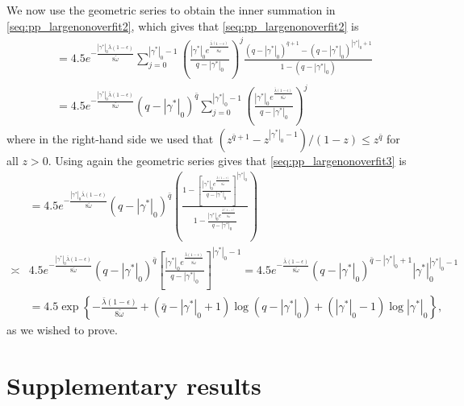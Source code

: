 We now use the geometric series to obtain the inner summation in \eqref{seq:pp_largenonoverfit2}, which gives that \eqref{seq:pp_largenonoverfit2} is
\begin{align}
&=4.5 e^{ -\frac{|\gamma^*|_0\bar{\lambda}(1-\epsilon)}{ 8\tilde{\omega}}}
 \sum_{j=0}^{|\gamma^*|_0-1} \left( \frac{|\gamma^*|_0 e^{ \frac{\bar{\lambda}(1-\epsilon)}{ 8\tilde{\omega}}}}{q - |\gamma^*|_0} \right)^j  
\frac{(q-|\gamma^*|_0)^{\bar{q}+1} - (q-|\gamma^*|_0)^{|\gamma^*|_0+1}}{1 - (q-|\gamma^*|_0)}
\nonumber \\
&=4.5 e^{ -\frac{|\gamma^*|_0\bar{\lambda}(1-\epsilon)}{ 8\tilde{\omega}}}
(q-|\gamma^*|_0)^{\bar{q}}
 \sum_{j=0}^{|\gamma^*|_0-1} \left( \frac{|\gamma^*|_0 e^{ \frac{\bar{\lambda}(1-\epsilon)}{ 8\tilde{\omega}}}}{q - |\gamma^*|_0} \right)^j  
\label{seq:pp_largenonoverfit3}
\end{align}
where in the right-hand side we used that $(z^{\bar{q}+1} - z^{|\gamma^*|_0-1})/(1-z) \leq z^{\bar{q}}$ for all $z>0$.
Using again the geometric series gives that \eqref{seq:pp_largenonoverfit3} is
\begin{align}
&= 4.5 e^{ -\frac{|\gamma^*|_0\bar{\lambda}(1-\epsilon)}{ 8\tilde{\omega}}}
(q-|\gamma^*|_0)^{\bar{q}}
\left( \frac{1 - \left[ \frac{|\gamma^*|_0 e^{ \frac{\bar{\lambda}(1-\epsilon)}{ 8\tilde{\omega}}}}{q - |\gamma^*|_0} \right]^{|\gamma^*|_0}}{1 - \frac{|\gamma^*|_0 e^{ \frac{\bar{\lambda}(1-\epsilon)}{ 8\tilde{\omega}}}}{q - |\gamma^*|_0}} \right)
\nonumber \\
\asymp
&4.5 e^{ -\frac{|\gamma^*|_0\bar{\lambda}(1-\epsilon)}{ 8\tilde{\omega}}}
(q-|\gamma^*|_0)^{\bar{q}}
\left[ \frac{|\gamma^*|_0 e^{ \frac{\bar{\lambda}(1-\epsilon)}{ 8\tilde{\omega}}}}{q - |\gamma^*|_0} \right]^{|\gamma^*|_0 -1}
=  4.5 e^{ -\frac{\bar{\lambda}(1-\epsilon)}{ 8\tilde{\omega}}} (q - |\gamma^*|_0)^{\bar{q}-|\gamma^*|_0+1}  |\gamma^*|_0^{|\gamma^*|_0-1}
\nonumber \\
&=4.5 \exp \left\{  -\frac{\bar{\lambda}(1-\epsilon)}{ 8\tilde{\omega}} + (\bar{q}-|\gamma^*|_0+1) \log(q - |\gamma^*|_0) + (|\gamma^*|_0-1) \log |\gamma^*|_0 \right\},
\nonumber
\end{align}
as we wished to prove.



\section{Supplementary results}
\label{ssec:suppl_results}


